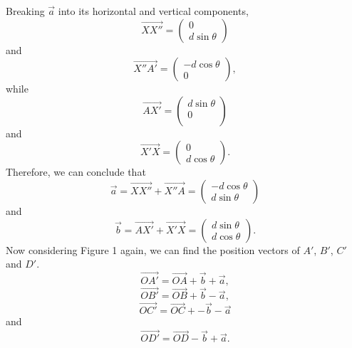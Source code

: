 \documentclass{article}
\begin{document}
Breaking $\vec{a}$ into its horizontal and vertical components, 
$$\overrightarrow{XX''} = 
\begin{pmatrix}
	0\\
	d\sin{\theta}
\end{pmatrix}$$
and
$$\overrightarrow{X''A'} =
\begin{pmatrix}
	-d\cos{\theta}\\
	0
\end{pmatrix},$$ 
while 
$$\overrightarrow{AX'} = 
\begin{pmatrix}
	d\sin{\theta}\\
	0\\
\end{pmatrix}$$
and 
$$\overrightarrow{X'X} = 
\begin{pmatrix}
	0\\
	d\cos{\theta}
\end{pmatrix}.$$
Therefore, we can conclude that $$\vec{a} = \overrightarrow{XX''} + \overrightarrow{X''A}= 
\begin{pmatrix}
	-d\cos{\theta}\\
	d\sin{\theta}
\end{pmatrix}$$
and 
$$\vec{b} = \overrightarrow{AX'} + \overrightarrow{X'X} = 
\begin{pmatrix}
	d\sin{\theta}\\
	d\cos{\theta}
\end{pmatrix}.$$
Now considering Figure 1 again, we can find the position vectors of $A'$, $B'$, $C'$ and $D'$. $$\overrightarrow{OA'} = \overrightarrow{OA} + \vec{b} + \vec{a},$$ $$\overrightarrow{OB'} = \overrightarrow{OB} + \vec{b} - \vec{a},$$ $$\overrightarrow{OC'} = \overrightarrow{OC} + -\vec{b} - \vec{a}$$ and $$\overrightarrow{OD'} = \overrightarrow{OD} - \vec{b} + \vec{a}.$$
\end{document}
